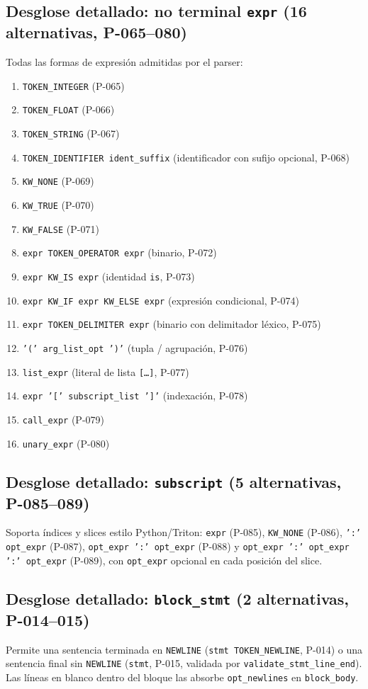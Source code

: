 \subsection{Desglose detallado: no terminal \texttt{expr} (16 alternativas, P-065--080)}
Todas las formas de expresión admitidas por el parser:

\begin{enumerate}
  \item \texttt{TOKEN\_INTEGER} (P-065)
  \item \texttt{TOKEN\_FLOAT} (P-066)
  \item \texttt{TOKEN\_STRING} (P-067)
  \item \texttt{TOKEN\_IDENTIFIER ident\_suffix} (identificador con sufijo opcional, P-068)
  \item \texttt{KW\_NONE} (P-069)
  \item \texttt{KW\_TRUE} (P-070)
  \item \texttt{KW\_FALSE} (P-071)
  \item \texttt{expr TOKEN\_OPERATOR expr} (binario, P-072)
  \item \texttt{expr KW\_IS expr} (identidad \texttt{is}, P-073)
  \item \texttt{expr KW\_IF expr KW\_ELSE expr} (expresión condicional, P-074)
  \item \texttt{expr TOKEN\_DELIMITER expr} (binario con delimitador léxico, P-075)
  \item \texttt{'(' arg\_list\_opt ')'} (tupla / agrupación, P-076)
  \item \texttt{list\_expr} (literal de lista \texttt{[\ldots]}, P-077)
  \item \texttt{expr '[' subscript\_list ']'} (indexación, P-078)
  \item \texttt{call\_expr} (P-079)
  \item \texttt{unary\_expr} (P-080)
\end{enumerate}

\subsection{Desglose detallado: \texttt{subscript} (5 alternativas, P-085--089)}
Soporta índices y slices estilo Python/Triton: \texttt{expr} (P-085), \texttt{KW\_NONE} (P-086), \texttt{':' opt\_expr} (P-087), \texttt{opt\_expr ':' opt\_expr} (P-088) y \texttt{opt\_expr ':' opt\_expr ':' opt\_expr} (P-089), con \texttt{opt\_expr} opcional en cada posición del slice.

\subsection{Desglose detallado: \texttt{block\_stmt} (2 alternativas, P-014--015)}
Permite una sentencia terminada en \texttt{NEWLINE} (\texttt{stmt TOKEN\_NEWLINE}, P-014) o una sentencia final sin \texttt{NEWLINE} (\texttt{stmt}, P-015, validada por \texttt{validate\_stmt\_line\_end}). Las líneas en blanco dentro del bloque las absorbe \texttt{opt\_newlines} en \texttt{block\_body}.

